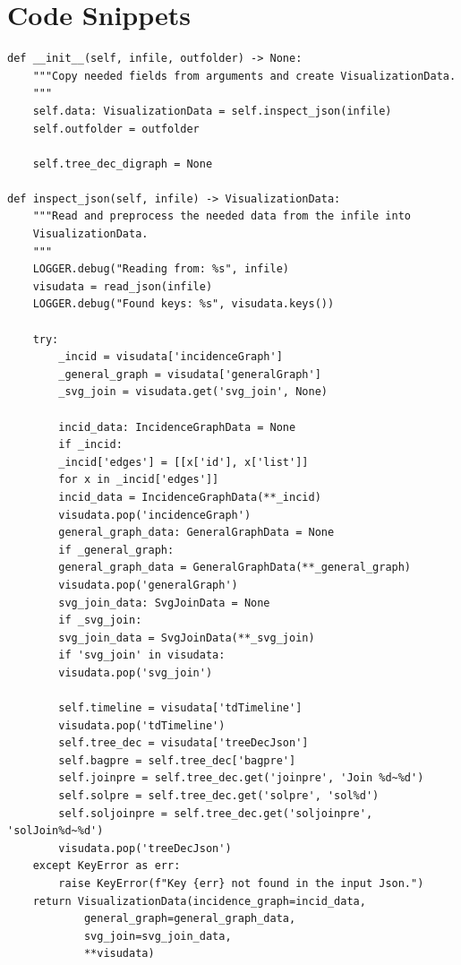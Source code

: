 \documentclass[a4paper, 12pt, bibliography=totoc]{scrartcl}
\begin{document}
\newpage
\section{Code Snippets}



{}

\begin{lstlisting}[style=custompy, caption={Initializing a Visualization object}, label={lst:visuinit}]
def __init__(self, infile, outfolder) -> None:
	"""Copy needed fields from arguments and create VisualizationData.
	"""
	self.data: VisualizationData = self.inspect_json(infile)
	self.outfolder = outfolder

	self.tree_dec_digraph = None

def inspect_json(self, infile) -> VisualizationData:
	"""Read and preprocess the needed data from the infile into 
	VisualizationData.
	"""
	LOGGER.debug("Reading from: %s", infile)
	visudata = read_json(infile)
	LOGGER.debug("Found keys: %s", visudata.keys())
	
	try:
		_incid = visudata['incidenceGraph']
		_general_graph = visudata['generalGraph']
		_svg_join = visudata.get('svg_join', None)
		
		incid_data: IncidenceGraphData = None
		if _incid:
		_incid['edges'] = [[x['id'], x['list']]
		for x in _incid['edges']]
		incid_data = IncidenceGraphData(**_incid)
		visudata.pop('incidenceGraph')
		general_graph_data: GeneralGraphData = None
		if _general_graph:
		general_graph_data = GeneralGraphData(**_general_graph)
		visudata.pop('generalGraph')
		svg_join_data: SvgJoinData = None
		if _svg_join:
		svg_join_data = SvgJoinData(**_svg_join)
		if 'svg_join' in visudata:
		visudata.pop('svg_join')
		
		self.timeline = visudata['tdTimeline']
		visudata.pop('tdTimeline')
		self.tree_dec = visudata['treeDecJson']
		self.bagpre = self.tree_dec['bagpre']
		self.joinpre = self.tree_dec.get('joinpre', 'Join %d~%d')
		self.solpre = self.tree_dec.get('solpre', 'sol%d')
		self.soljoinpre = self.tree_dec.get('soljoinpre', 'solJoin%d~%d')
		visudata.pop('treeDecJson')
	except KeyError as err:
		raise KeyError(f"Key {err} not found in the input Json.")
	return VisualizationData(incidence_graph=incid_data,
			general_graph=general_graph_data,
			svg_join=svg_join_data,
			**visudata)

\end{lstlisting}\pagebreak
\end{document}
